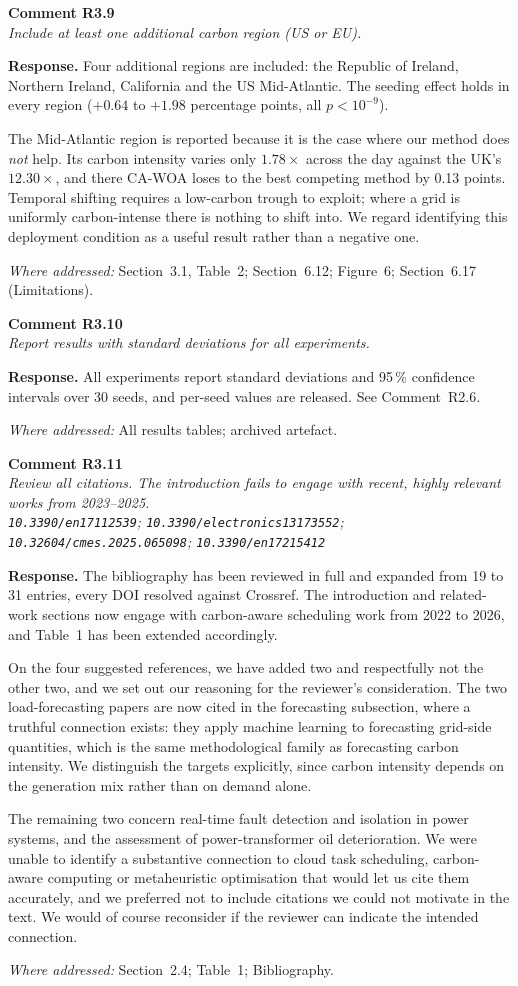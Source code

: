 \documentclass[11pt,a4paper]{article}
\newcommand{\rsp}[1]{\vspace{2pt}\noindent\textbf{Response.} #1\par\vspace{6pt}}
\newcommand{\rwhere}[1]{\noindent\textit{Where addressed:} #1\par\vspace{10pt}}
\newenvironment{revcomment}[1]
  {\begin{tcolorbox}[colback=gray!6,colframe=gray!45,boxrule=0.4pt,
     left=6pt,right=6pt,top=4pt,bottom=4pt]\textbf{#1}\\[2pt]\itshape\color{cmt}}
  {\end{tcolorbox}\vspace{4pt}}
\begin{document}
\begin{revcomment}{Comment R3.9}
Include at least one additional carbon region (US or EU).
\end{revcomment}
\rsp{Four additional regions are included: the Republic of Ireland, Northern Ireland,
California and the US Mid-Atlantic. The seeding effect holds in every region
($+0.64$ to $+1.98$ percentage points, all $p < 10^{-9}$).

The Mid-Atlantic region is reported because it is the case where our method does
\emph{not} help. Its carbon intensity varies only $1.78\times$ across the day
against the UK's $12.30\times$, and there CA-WOA loses to the best competing method
by 0.13 points. Temporal shifting requires a low-carbon trough to exploit; where a
grid is uniformly carbon-intense there is nothing to shift into. We regard
identifying this deployment condition as a useful result rather than a negative
one.}
\rwhere{Section~3.1, Table~2; Section~6.12; Figure~6; Section~6.17 (Limitations).}

\begin{revcomment}{Comment R3.10}
Report results with standard deviations for all experiments.
\end{revcomment}
\rsp{All experiments report standard deviations and 95\,\% confidence intervals over
30 seeds, and per-seed values are released. See Comment~R2.6.}
\rwhere{All results tables; archived artefact.}

\begin{revcomment}{Comment R3.11}
Review all citations. The introduction fails to engage with recent, highly relevant
works from 2023--2025. \\
\texttt{10.3390/en17112539}; \texttt{10.3390/electronics13173552};\\
\texttt{10.32604/cmes.2025.065098}; \texttt{10.3390/en17215412}
\end{revcomment}
\rsp{The bibliography has been reviewed in full and expanded from 19 to 31 entries,
every DOI resolved against Crossref. The introduction and related-work sections now
engage with carbon-aware scheduling work from 2022 to 2026, and Table~1 has been
extended accordingly.

On the four suggested references, we have added two and respectfully not the other
two, and we set out our reasoning for the reviewer's consideration. The two
load-forecasting papers are now cited in the forecasting subsection, where a
truthful connection exists: they apply machine learning to forecasting grid-side
quantities, which is the same methodological family as forecasting carbon
intensity. We distinguish the targets explicitly, since carbon intensity depends on
the generation mix rather than on demand alone.

The remaining two concern real-time fault detection and isolation in power systems,
and the assessment of power-transformer oil deterioration. We were unable to
identify a substantive connection to cloud task scheduling, carbon-aware computing
or metaheuristic optimisation that would let us cite them accurately, and we
preferred not to include citations we could not motivate in the text. We would of
course reconsider if the reviewer can indicate the intended connection.}
\rwhere{Section~2.4; Table~1; Bibliography.}
\end{document}
